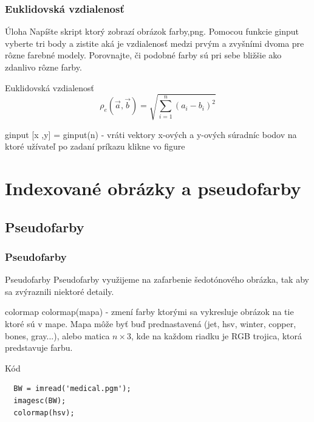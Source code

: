\documentclass{beamer}
\begin{document}
\begin{frame}
\frametitle{Euklidovská vzdialenosť}
  \begin{block}{Úloha}
  Napíšte skript ktorý zobrazí obrázok farby,png. Pomocou funkcie ginput vyberte tri body a zistite aká je vzdialenosť medzi prvým a zvyšními dvoma pre rôzne farebné modely. Porovnajte, či podobné farby sú pri sebe bližšie ako zdanlivo rôzne farby.
  \end{block} 
  
    \begin{block}{Euklidovská vzdialenosť}
  \begin{equation*}
  \rho_e(\vec{a}, \vec{b}) = \sqrt{\sum_{i=1}^n (a_i - b_i)^2}
  \end{equation*}
  \end{block} 

  \begin{block}{ginput}
  [x ,y] = ginput(n) - vráti vektory x-ových a y-ových súradníc bodov na ktoré užívateľ po zadaní príkazu klikne vo figure
  \end{block} 
\end{frame}


\section{Indexované obrázky a pseudofarby}
\subsection{Pseudofarby}
\begin{frame}[fragile]
\frametitle{Pseudofarby}
  \begin{block}{Pseudofarby}
  Pseudofarby využijeme na zafarbenie šedotónového obrázka, tak aby sa zvýraznili niektoré detaily.
  \end{block} 
  
  \begin{block}{colormap}
  colormap(mapa) - zmení farby ktorými sa vykresluje obrázok na tie ktoré sú v mape. Mapa môže byť buď prednastavená (jet, hsv, winter, copper, bones, gray...), alebo matica $n \times 3$, kde na každom riadku je RGB trojica, ktorá predstavuje farbu.
  \end{block} 

  \begin{block}{Kód}
  \begin{verbatim}
  BW = imread('medical.pgm');
  imagesc(BW);
  colormap(hsv);\end{verbatim}
  \end{block} 
\end{frame}
\end{document}
